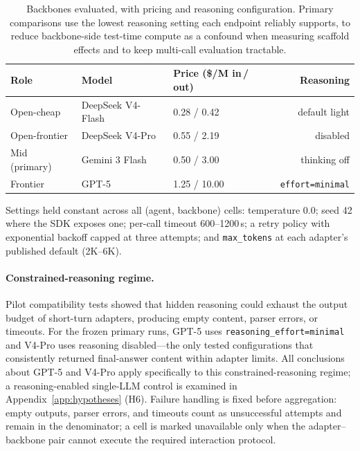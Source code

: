 \documentclass[letterpaper]{article} %
\begin{document}
\begin{table}[h]
\centering
\scriptsize
\setlength{\tabcolsep}{3.0pt}
\caption{Backbones evaluated, with pricing and reasoning configuration. Primary
comparisons use the lowest reasoning setting each endpoint reliably supports, to
reduce backbone-side test-time compute as a confound when measuring scaffold
effects and to keep multi-call evaluation tractable.}
\label{tab:backbones}
\begin{tabular}{@{}lllr@{}}
\toprule
Role & Model & Price (\$/M in\,/\,out) & Reasoning \\
\midrule
Open-cheap & DeepSeek V4-Flash & 0.28 / 0.42 & default light \\
Open-frontier & DeepSeek V4-Pro & 0.55 / 2.19 & disabled \\
Mid (primary) & Gemini 3 Flash & 0.50 / 3.00 & thinking off \\
Frontier & GPT-5 & 1.25 / 10.00 & \texttt{effort=minimal} \\
\bottomrule
\end{tabular}
\end{table}

Settings held constant across all (agent, backbone) cells: temperature 0.0;
seed 42 where the SDK exposes one; per-call timeout 600--1200\,s; a
retry policy with exponential backoff capped at three attempts; and
\texttt{max\_tokens} at each adapter's published default (2K--6K).

\paragraph{Constrained-reasoning regime.}
Pilot compatibility tests showed that hidden reasoning could exhaust the output
budget of short-turn adapters, producing empty content, parser errors, or
timeouts. For the frozen primary runs, GPT-5 uses
\texttt{reasoning\_effort=minimal} and V4-Pro uses reasoning disabled---the only
tested configurations that consistently returned final-answer content within
adapter limits. All conclusions about GPT-5 and V4-Pro apply specifically to
this constrained-reasoning regime; a reasoning-enabled single-LLM control is
examined in Appendix~\ref{app:hypotheses} (H6). Failure handling is fixed before
aggregation: empty outputs, parser errors, and timeouts count as unsuccessful
attempts and remain in the denominator; a cell is marked unavailable only when
the adapter--backbone pair cannot execute the required interaction protocol.

\end{document}
